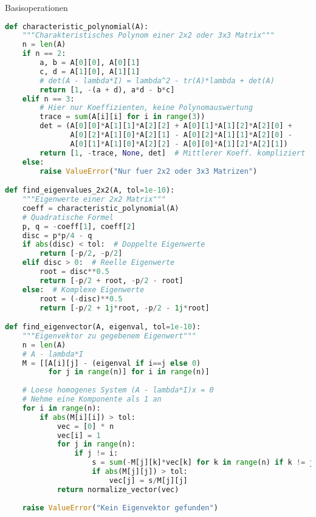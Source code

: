 \begin{examplecode}{Basisoperationen}
\begin{lstlisting}[language=Python, style=basesmol]
def characteristic_polynomial(A):
    """Charakteristisches Polynom einer 2x2 oder 3x3 Matrix"""
    n = len(A)
    if n == 2:
        a, b = A[0][0], A[0][1]
        c, d = A[1][0], A[1][1]
        # det(A - lambda*I) = lambda^2 - tr(A)*lambda + det(A)
        return [1, -(a + d), a*d - b*c]
    elif n == 3:
        # Hier nur Koeffizienten, keine Polynomauswertung
        trace = sum(A[i][i] for i in range(3))
        det = (A[0][0]*A[1][1]*A[2][2] + A[0][1]*A[1][2]*A[2][0] + 
               A[0][2]*A[1][0]*A[2][1] - A[0][2]*A[1][1]*A[2][0] - 
               A[0][1]*A[1][0]*A[2][2] - A[0][0]*A[1][2]*A[2][1])
        return [1, -trace, None, det]  # Mittlerer Koeff. kompliziert
    else:
        raise ValueError("Nur fuer 2x2 oder 3x3 Matrizen")

def find_eigenvalues_2x2(A, tol=1e-10):
    """Eigenwerte einer 2x2 Matrix"""
    coeff = characteristic_polynomial(A)
    # Quadratische Formel
    p, q = -coeff[1], coeff[2]
    disc = p*p/4 - q
    if abs(disc) < tol:  # Doppelte Eigenwerte
        return [-p/2, -p/2]
    elif disc > 0:  # Reelle Eigenwerte
        root = disc**0.5
        return [-p/2 + root, -p/2 - root]
    else:  # Komplexe Eigenwerte
        root = (-disc)**0.5
        return [-p/2 + 1j*root, -p/2 - 1j*root]

def find_eigenvector(A, eigenval, tol=1e-10):
    """Eigenvektor zu gegebenem Eigenwert"""
    n = len(A)
    # A - lambda*I
    M = [[A[i][j] - (eigenval if i==j else 0) 
          for j in range(n)] for i in range(n)]
    
    # Loese homogenes System (A - lambda*I)x = 0
    # Nehme eine Komponente als 1 an
    for i in range(n):
        if abs(M[i][i]) > tol:
            vec = [0] * n
            vec[i] = 1
            for j in range(n):
                if j != i:
                    s = sum(-M[j][k]*vec[k] for k in range(n) if k != j)
                    if abs(M[j][j]) > tol:
                        vec[j] = s/M[j][j]
            return normalize_vector(vec)
            
    raise ValueError("Kein Eigenvektor gefunden")
\end{lstlisting}
\end{examplecode}

